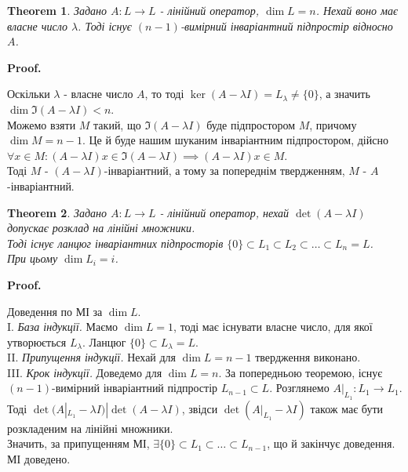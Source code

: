 \documentclass[a4paper, 10pt]{article}
\makeatletter
\theoremstyle{theoremdd}
\newtheorem{theorem}{Theorem}[subsection]
\renewenvironment{proof}[1][Proof.\\]{\par
\pushQED{\hfill \qed}%
\normalfont \topsep6\p@\@plus6\p@\relax
\trivlist
\item\relax
{\bfseries
#1\@addpunct{.}}\hspace\labelsep\ignorespaces
}{%
\popQED\endtrivlist\@endpefalse
}
\makeatother
\begin{document}
\iffalse
\begin{theorem}
Задано $A: L \to L$ - лінійний оператор, $\dim L = n$. Нехай воно має власне число $\lambda$. Тоді існує $(n-1)$-вимірний інваріантний підпростір відносно $A$.
\end{theorem}

\begin{proof}
Оскільки $\lambda$ - власне число $A$, то тоді $\ker (A-\lambda I) = L_{\lambda} \neq \{0\}$, а значить $\dim \Im (A-\lambda I) < n$.\\
Можемо взяти $M$ такий, що $\Im (A-\lambda I)$ буде підпростором $M$, причому $\dim M = n-1$. Це й буде нашим шуканим інваріантним підпростором, дійсно\\
$\forall x \in M: (A-\lambda I)x \in \Im (A-\lambda I) \implies (A-\lambda I)x \in M$.\\
Тоді $M$ - $(A-\lambda I)$-інваріантний, а тому за попереднім твердженням, $M$ - $A$-інваріантний.
\end{proof}

\begin{theorem}
Задано $A: L \to L$ - лінійний оператор, нехай $\det (A-\lambda I)$ допускає розклад на лінійні множники.\\
Тоді існує ланцюг інваріантних підпросторів $\{0\} \subset L_1 \subset L_2 \subset \dots \subset L_n = L$.\\
При цьому $\dim L_i = i$.
\end{theorem}

\begin{proof}
Доведення по МІ за $\dim L$.\\
I. \textit{База індукції.} Маємо $\dim L = 1$, тоді має існувати власне число, для якої утворюється $L_{\lambda}$. Ланцюг $\{0\} \subset L_{\lambda} = L$.\\
II. \textit{Припущення індукції.} Нехай для $\dim L = n-1$ твердження виконано.\\
III. \textit{Крок індукції.} Доведемо для $\dim L = n$. За попередньою теоремою, існує $(n-1)$-вимірний інваріантний підпростір $L_{n-1} \subset L$. Розглянемо $A|_{L_1}: L_1 \to L_1$. Тоді $\det (A|_{L_1}-\lambda I) | \det(A-\lambda I)$, звідси $\det (A|_{L_1}-\lambda I)$ також має бути розкладеним на лінійні множники.\\
Значить, за припущенням МІ, $\exists \{0\} \subset L_1 \subset \dots \subset L_{n-1}$, що й закінчує доведення.\\
МІ доведено.
\end{proof}
\end{document}
